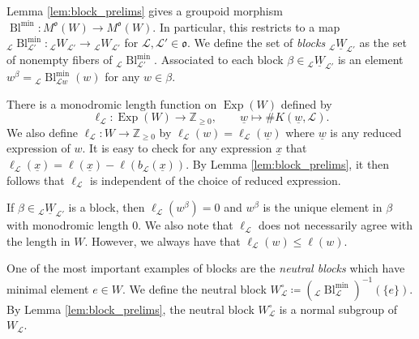 \documentclass{amsart}
\newcommand{\Z}{\mathbb{Z}}
\newcommand{\scrL}{\mathcal{L}}
\newcommand{\fr}[1]{\mathfrak{#1}}
\DeclareMathOperator{\Exp}{Exp}
\newcommand{\W}[2]{{}_{#1}W_{#2}}
\newcommand{\uW}[2]{{}_{#1}\underline{W}_{#2}}
\newcommand{\uw}{\underline{w}}
\newcommand{\ux}{\underline{x}}
\DeclareMathOperator{\Bl}{Bl}
\theoremstyle{definition}
\numberwithin{equation}{subsection}
\begin{document}
Lemma \ref{lem:block_prelims} gives a groupoid morphism $\Bl^{\min} : M^{\fr{o}} (W) \to M^{\fr{o}} (W)$. In particular, this restricts to a map ${}_{\scrL} \Bl^{\min}_{\scrL'} : \W{\scrL}{\scrL'} \to \W{\scrL}{\scrL'}$ for $\scrL, \scrL' \in \fr{o}$.
We define the set of \emph{blocks} $\uW{\scrL}{\scrL'}$ as the set of nonempty fibers of ${}_{\scrL} \Bl^{\min}_{\scrL'}$.
Associated to each block $\beta \in \uW{\scrL}{\scrL'}$ is an element $w^\beta = {}_{\scrL} \Bl^{\min}_{\scrL w} (w)$ for any $w \in \beta$.

There is a monodromic length function on $\Exp (W)$ defined by
\[\ell_{\scrL} : \Exp (W) \to \Z_{\geq 0}, \qquad \uw \mapsto \# K (\uw, \scrL).\]
We also define $\ell_{\scrL} : W \to \Z_{\geq 0}$ by $\ell_{\scrL} (w) = \ell_{\scrL} (\uw)$ where $\uw$ is any reduced expression of $w$.
It is easy to check for any expression $\ux$ that $\ell_{\scrL} (\ux) = \ell (\ux) - \ell (b_{\scrL} (\ux))$.
By Lemma \ref{lem:block_prelims}, it then follows that $\ell_{\scrL}$ is independent of the choice of reduced expression.

If $\beta \in \uW{\scrL}{\scrL'}$ is a block, then $\ell_{\scrL} (w^\beta) = 0$ and $w^{\beta}$ is the unique element in $\beta$ with monodromic length 0.
We also note that $\ell_{\scrL}$ does not necessarily agree with the length in $W$.
However, we always have that $\ell_{\scrL} (w) \leq \ell (w)$.

One of the most important examples of blocks are the \emph{neutral blocks} which have minimal element $e \in W$.
We define the neutral block $W_{\scrL}^{\circ} \coloneq ({}_{\scrL} \Bl^{\min}_{\scrL})^{-1} (\{e\})$.
By Lemma \ref{lem:block_prelims}, the neutral block $W_{\scrL}^\circ$ is a normal subgroup of $W_{\scrL}$.
\end{document}
